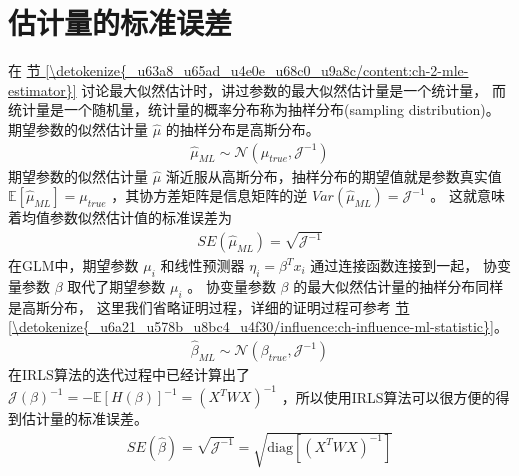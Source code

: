 \documentclass[letterpaper,10pt,english]{sphinxmanual}
\begin{document}
\section{估计量的标准误差}
\label{\detokenize{_u5e7f_u4e49_u7ebf_u6027_u6a21_u578b/estimate:id12}}
在 \hyperref[\detokenize{_u63a8_u65ad_u4e0e_u68c0_u9a8c/content:ch-2-mle-estimator}]{节 \ref{\detokenize{_u63a8_u65ad_u4e0e_u68c0_u9a8c/content:ch-2-mle-estimator}}} 讨论最大似然估计时，讲过参数的最大似然估计量是一个统计量，
而统计量是一个随机量，统计量的概率分布称为抽样分布(sampling distribution)。
期望参数的似然估计量 \(\hat{\mu}\) 的抽样分布是高斯分布。
\begin{equation}\label{equation:广义线性模型/estimate:广义线性模型/estimate:45}
\begin{split}\hat{\mu}_{ML} \sim  \mathcal{N}(\mu_{true},\mathcal{J}^{-1})\end{split}
\end{equation}
期望参数的似然估计量 \(\hat{\mu}\) 渐近服从高斯分布，抽样分布的期望值就是参数真实值
\(\mathbb{E}[\hat{\mu}_{ML}] = \mu_{true}\)
，其协方差矩阵是信息矩阵的逆 \(Var(\hat{\mu}_{ML}) = \mathcal{J}^{-1}\) 。
这就意味着均值参数似然估计值的标准误差为
\begin{equation}\label{equation:广义线性模型/estimate:广义线性模型/estimate:46}
\begin{split}SE(\hat{\mu}_{ML}) = \sqrt{ \mathcal{J}^{-1} }\end{split}
\end{equation}
在GLM中，期望参数 \(\mu_i\) 和线性预测器 \(\eta_i=\beta^T x_i\) 通过连接函数连接到一起，
协变量参数 \(\beta\) 取代了期望参数 \(\mu_i\) 。
协变量参数 \(\beta\) 的最大似然估计量的抽样分布同样是高斯分布，
这里我们省略证明过程，详细的证明过程可参考 \hyperref[\detokenize{_u6a21_u578b_u8bc4_u4f30/influence:ch-influence-ml-statistic}]{节 \ref{\detokenize{_u6a21_u578b_u8bc4_u4f30/influence:ch-influence-ml-statistic}}}。
\begin{equation}\label{equation:广义线性模型/estimate:广义线性模型/estimate:47}
\begin{split}\hat{\beta}_{ML} \sim  \mathcal{N}(\beta_{true},\mathcal{J}^{-1})\end{split}
\end{equation}
在IRLS算法的迭代过程中已经计算出了 \(\mathcal{J}(\beta)^{-1}=- \mathbb{E}[H(\beta)]^{-1}=(X^T W X)^{-1}\)
，所以使用IRLS算法可以很方便的得到估计量的标准误差。
\begin{equation}\label{equation:广义线性模型/estimate:广义线性模型/estimate:48}
\begin{split}SE(\hat{\beta}) = \sqrt{\mathcal{J}^{-1}} = \sqrt{ \text{diag} [{(X^T W X)}^{-1} ]}\end{split}
\end{equation}
\end{document}
